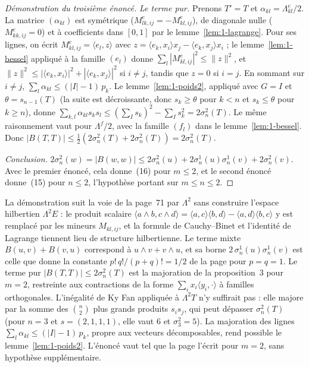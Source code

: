 \begin{proof}[Démonstration du troisième énoncé]
\emph{Le terme pur.} Prenons $T' = T$ et $\alpha_{kl} = \Lambda^e_{kl}/2$. La matrice $(\alpha_{kl})$ est symétrique ($M^e_{lk,ij} = -M^e_{kl,ij}$), de diagonale nulle ($M^e_{kk,ij} = 0$) et à coefficients dans $[0, 1]$ par le lemme~\ref{lem:1-lagrange}. Pour ses lignes, on écrit $M^e_{kl,ij} = \langle e_l, z\rangle$ avec $z = \langle e_k, x_i\rangle x_j - \langle e_k, x_j\rangle x_i$ ; le lemme~\ref{lem:1-bessel} appliqué à la famille $(e_l)$ donne $\sum_l |M^e_{kl,ij}|^2 \leq \|z\|^2$, et $\|z\|^2 \leq |\langle e_k, x_i\rangle|^2 + |\langle e_k, x_j\rangle|^2$ si $i \neq j$, tandis que $z = 0$ si $i = j$. En sommant sur $i \neq j$, $\sum_l \alpha_{kl} \leq (|I| - 1)\,p_k$. Le lemme~\ref{lem:1-poids2}, appliqué avec $G = I$ et $\theta = s_{n-1}(T)$ (la suite est décroissante, donc $s_k \geq \theta$ pour $k < n$ et $s_k \leq \theta$ pour $k \geq n$), donne $\sum_{k,l} \alpha_{kl} s_k s_l \leq (\sum_I s_k)^2 - \sum_I s_k^2 = 2\sigma_n^2(T)$. Le même raisonnement vaut pour $\Lambda^f/2$, avec la famille $(f_l)$ dans le lemme~\ref{lem:1-bessel}. Donc $|B(T, T)| \leq \frac12 (2\sigma_n^2(T) + 2\sigma_n^2(T)) = 2\sigma_n^2(T)$.

\emph{Conclusion.} $2\sigma_n^2(w) = |B(w,w)| \leq 2\sigma_n^2(u) + 2\sigma_n^1(u)\sigma_n^1(v) + 2\sigma_n^2(v)$. Avec le premier énoncé, cela donne~(16) pour $m \leq 2$, et le second énoncé donne~(15) pour $n \leq 2$, l'hypothèse portant sur $m \leq n \leq 2$.
\end{proof}

\begin{remarque}
La démonstration suit la voie de la page~71 par $\Lambda^2$ sans construire l'espace hilbertien $\Lambda^2 E$ : le produit scalaire $\langle a \wedge b, c \wedge d\rangle = \langle a, c\rangle\langle b, d\rangle - \langle a, d\rangle\langle b, c\rangle$ y est remplacé par les mineurs $M_{kl,ij}$, et la formule de Cauchy--Binet et l'identité de Lagrange tiennent lieu de structure hilbertienne. Le terme mixte $B(u, v) + B(v, u)$ correspond à $u \wedge v + v \wedge u$, et sa borne $2\,\sigma_n^1(u)\sigma_n^1(v)$ est celle que donne la constante $p!\,q!/(p+q)! = 1/2$ de la page pour $p = q = 1$. Le terme pur $|B(T, T)| \leq 2\sigma_n^2(T)$ est la majoration de la proposition~3 pour $m = 2$, restreinte aux contractions de la forme $\sum_i x_i \langle y_i, \cdot\rangle$ à familles orthogonales. L'inégalité de Ky Fan appliquée à $\Lambda^2 T$ n'y suffirait pas : elle majore par la somme des $\binom n2$ plus grands produits $s_is_j$, qui peut dépasser $\sigma_n^2(T)$ (pour $n = 3$ et $s = (2, 1, 1, 1)$, elle vaut $6$ et $\sigma_3^2 = 5$). La majoration des lignes $\sum_l \alpha_{kl} \leq (|I| - 1)\,p_k$, propre aux vecteurs décomposables, rend possible le lemme~\ref{lem:1-poids2}. L'énoncé vaut tel que la page l'écrit pour $m = 2$, sans hypothèse supplémentaire.
\end{remarque}

